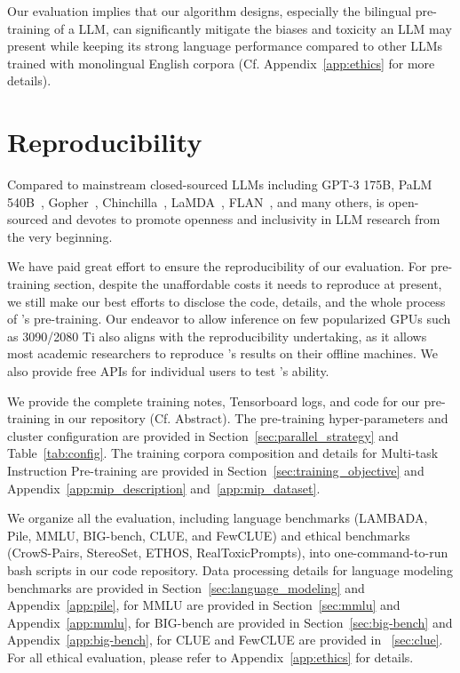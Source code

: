 Our evaluation implies that our algorithm designs, especially the bilingual pre-training of a LLM, can significantly mitigate the biases and toxicity an LLM may present while keeping its strong language performance compared to other LLMs~\citep{brown2020language,zhang2022opt} trained with monolingual English corpora (Cf. Appendix~\ref{app:ethics} for more details).

\section*{Reproducibility}
Compared to mainstream closed-sourced LLMs including GPT-3 175B\citep{brown2020language}, PaLM 540B~\citep{chowdhery2022palm}, Gopher~\citep{rae2021scaling}, Chinchilla~\citep{hoffmann2022training}, LaMDA~\citep{thoppilan2022lamda}, FLAN~\citep{wei2022finetuned}, and many others, \glm is open-sourced and devotes to promote openness and inclusivity in LLM research from the very beginning.

We have paid great effort to ensure the reproducibility of our evaluation.
For pre-training section, despite the unaffordable costs it needs to reproduce at present, we still make our best efforts to disclose the code, details, and the whole process of \glm's pre-training. 
Our endeavor to allow \glm inference on few popularized GPUs such as 3090/2080 Ti also aligns with the reproducibility undertaking, as it allows most academic researchers to reproduce \glm's results on their offline machines.
We also provide free APIs for individual users to test \glm's ability.

We provide the complete training notes, Tensorboard logs, and code for our pre-training in our repository (Cf. Abstract).
The pre-training hyper-parameters and cluster configuration are provided in Section~\ref{sec:parallel_strategy} and Table~\ref{tab:config}.
The training corpora composition and details for Multi-task Instruction Pre-training are provided in Section~\ref{sec:training_objective} and Appendix~\ref{app:mip_description} and~\ref{app:mip_dataset}. 

We organize all the evaluation, including language benchmarks (LAMBADA, Pile, MMLU, BIG-bench, CLUE, and FewCLUE) and ethical benchmarks (CrowS-Pairs, StereoSet, ETHOS, RealToxicPrompts), into one-command-to-run bash scripts in our code repository.
Data processing details for language modeling benchmarks are provided in Section~\ref{sec:language_modeling} and Appendix~\ref{app:pile}, for MMLU are provided in Section~\ref{sec:mmlu} and Appendix~\ref{app:mmlu}, for BIG-bench are provided in Section~\ref{sec:big-bench} and Appendix~\ref{app:big-bench}, for CLUE and FewCLUE are provided in ~\ref{sec:clue}.
For all ethical evaluation, please refer to Appendix~\ref{app:ethics} for details.

\clearpage

